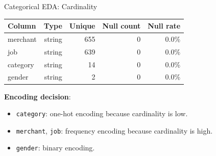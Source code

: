 \documentclass{beamer}
\begin{document}
\begin{frame}{Categorical EDA: Cardinality}
    \begin{table}
        \centering
        \small
        \begin{tabular}{lrrrr}
            \toprule
            \textbf{Column} & \textbf{Type} & \textbf{Unique} & \textbf{Null count} & \textbf{Null rate} \\
            \midrule
            merchant & string & 655 & 0 & 0.0\% \\
            job & string & 639 & 0 & 0.0\% \\
            category & string & 14 & 0 & 0.0\% \\
            gender & string & 2 & 0 & 0.0\% \\
            \bottomrule
        \end{tabular}
    \end{table}

    \vspace{0.35cm}
    \textbf{Encoding decision}:
    \begin{itemize}
        \item \texttt{category}: one-hot encoding because cardinality is low.
        \item \texttt{merchant}, \texttt{job}: frequency encoding because cardinality is high.
        \item \texttt{gender}: binary encoding.
    \end{itemize}
\end{frame}
\end{document}
